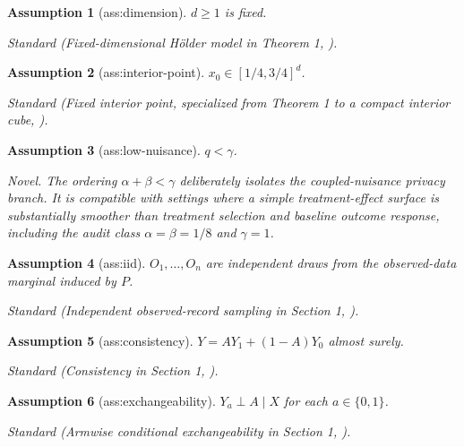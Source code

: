 \documentclass{article}
\newtheorem{assumption}{Assumption}
\begin{document}
\begin{assumption}[ass:dimension]\label{ass:dimension}
\(d\ge 1\) is fixed.
\par\smallskip\noindent\emph{Standard} (Fixed-dimensional Hölder model in Theorem 1, \cite{kennedy2024minimax}).
\end{assumption}

\begin{assumption}[ass:interior-point]\label{ass:interior-point}
\(x_0\in[1/4,3/4]^d\).
\par\smallskip\noindent\emph{Standard} (Fixed interior point, specialized from Theorem 1 to a compact interior cube, \cite{kennedy2024minimax}).
\end{assumption}

\begin{assumption}[ass:low-nuisance]\label{ass:low-nuisance}
\(q<\gamma\).
\par\smallskip\noindent\emph{Novel.} The ordering \(\alpha+\beta<\gamma\) deliberately isolates the coupled-nuisance privacy branch. It is compatible with settings where a simple treatment-effect surface is substantially smoother than treatment selection and baseline outcome response, including the audit class \(\alpha=\beta=1/8\) and \(\gamma=1\).
\end{assumption}

\begin{assumption}[ass:iid]\label{ass:iid}
\(O_1,\ldots,O_n\) are independent draws from the observed-data marginal induced by \(P\).
\par\smallskip\noindent\emph{Standard} (Independent observed-record sampling in Section 1, \cite{kennedy2024minimax}).
\end{assumption}

\begin{assumption}[ass:consistency]\label{ass:consistency}
\(Y=AY_1+(1-A)Y_0\) almost surely.
\par\smallskip\noindent\emph{Standard} (Consistency in Section 1, \cite{kennedy2024minimax}).
\end{assumption}

\begin{assumption}[ass:exchangeability]\label{ass:exchangeability}
\(Y_a\perp A\mid X\) for each \(a\in\{0,1\}\).
\par\smallskip\noindent\emph{Standard} (Armwise conditional exchangeability in Section 1, \cite{kennedy2024minimax}).
\end{assumption}
\end{document}
